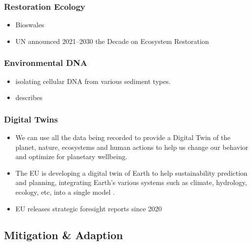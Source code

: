\documentclass[
  letterpaper,
  DIV=11,
  numbers=noendperiod]{scrartcl}
\begin{document}
\subsubsection{Restoration Ecology}\label{restoration-ecology}

\begin{itemize}
\item
  Bioswales
\item
  \citet{fischerMakingDecadeEcosystem2021} UN announced 2021--2030 the
  Decade on Ecosystem Restoration
\end{itemize}

\subsubsection{\texorpdfstring{\textbf{Environmental
DNA}}{Environmental DNA}}\label{environmental-dna}

\begin{itemize}
\item
  \citet{ogramExtractionPurificationMicrobial1987} isolating cellular
  DNA from various sediment types.
\item
  \citet{peterandreysmitharchivepageHowEnvironmentalDNA2024} describes
\end{itemize}

\subsubsection{Digital Twins}\label{digital-twins}

\begin{itemize}
\item
  We can use all the data being recorded to provide a Digital Twin of
  the planet, nature, ecosystems and human actions to help us change our
  behavior and optimize for planetary wellbeing.
\item
  The EU is developing a digital twin of Earth to help sustainability
  prediction and planning, integrating Earth's various systems such as
  climate, hydrology, ecology, etc, into a single model \citep[ and
  \citet{DestinationEarthShaping2023}]{hoffmannDestinationEarthDigital2023}.
\item
  EU releases strategic foresight reports since 2020
  \citet{europeancommissionStrategicForesight2023}
\end{itemize}

\subsection{Mitigation \& Adaption}\label{mitigation-adaption}
\end{document}
